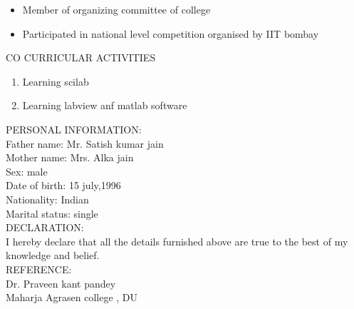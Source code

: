 \documentclass[11pt,a4paper]{article}
\begin{document}
\begin{flushleft}
	          \begin{itemize}
	          	\item Member of organizing committee of college\\
	          	\item Participated in national level competition organised by IIT bombay\\
	          	
	          \end{itemize}
	          \textsf{CO CURRICULAR ACTIVITIES}
	          \begin{enumerate}
	          	\item Learning scilab\\
	          	\item Learning labview anf matlab software	
	          \end{enumerate}
	          \textsf{PERSONAL INFORMATION:}\\ 
	          \medskip
	          Father name: Mr. Satish kumar jain\\
	          Mother name: Mrs. Alka jain\\
	          Sex: male\\
	          Date of birth: 15 july,1996\\
	          Nationality: Indian\\
	          Marital status: single\\
	          \medskip
	          \textsf{ DECLARATION: }\\
	          I hereby declare that all the details furnished above are true to the best of my knowledge and belief.\\
	          \medskip
	           \textsf{ REFERENCE: }\\
	           
	           
	           Dr. Praveen kant pandey\\
	           Maharja Agrasen college , DU\\
	           \medskip
\end{flushleft}

 
\end{document}

